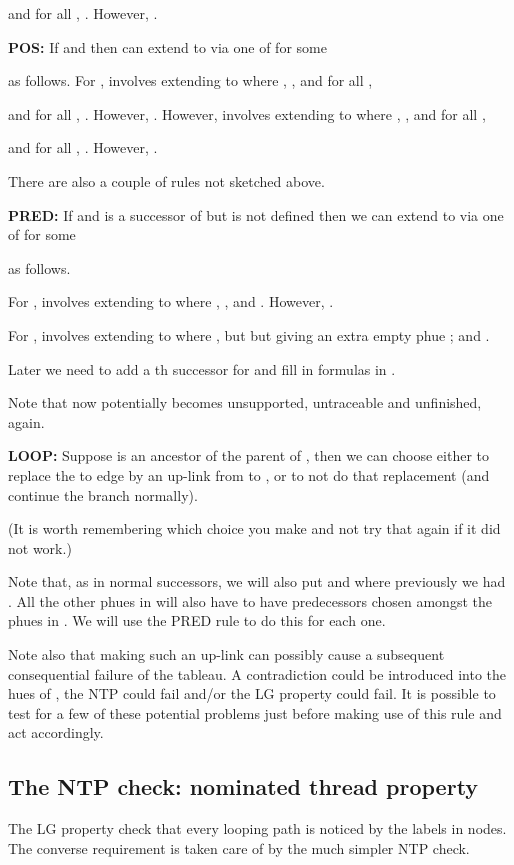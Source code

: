 \documentclass[submission,copyright,creativecommons]{eptcs}
\begin{document}
and
for all ,
.
However,
.


{\bf POS:}
If 
and  
then can extend  to 
via one of
 for some

as follows.
For ,  involves 
extending  to 
where
,
,
and
for all ,

and
for all ,
.
However,
.
However,  involves 
extending  to 
where
,
,
and
for all ,

and
for all ,
.
However,
.

There are also a couple of rules not sketched above.

{\bf PRED:}
If  and 
 is a successor of  but
 is not defined
then we can extend  to 
via one of
 for some

as follows.

For ,  involves 
extending  to 
where
,
,
and
.
However,
.

For ,
 involves 
extending  to 
where
, but
 but giving  an extra empty phue ;
and
.

Later we need to add a th successor for  and
fill in formulas in .

Note that  now potentially becomes 
unsupported, untraceable and unfinished, again.

{\bf LOOP:}
Suppose  is an ancestor of the parent  of ,
 then we can choose either to replace the  to  edge by an up-link from  to , or to not do that replacement (and continue the branch normally).

(It is worth remembering which choice you make and not try that again if it did not work.)

Note that, as in normal successors, we will also put
 and 
where 
previously we had
.
All the other phues in  will also have to have
predecessors chosen amongst the phues in
. We will use the PRED rule to do this for each one.

Note also that making such an up-link can possibly cause
a subsequent consequential failure of the tableau.
A contradiction could be introduced into the hues of ,
the NTP could fail and/or the LG property could fail.
It is possible to test for a few of these potential problems
just before making use of this rule and act accordingly.

\subsection{The NTP check: nominated thread property}

The LG property check that
every looping path 
is noticed by the
labels in nodes.
The converse requirement is taken care
of by the much simpler NTP check.
\end{document}
